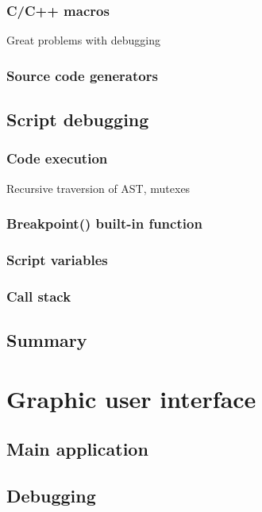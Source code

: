 \documentclass[11pt,twoside,a4paper]{book}
\begin{document}
\subsubsection{C/C++ macros}
Great problems with debugging

\subsubsection{Source code generators}


\subsection{Script debugging}

\subsubsection{Code execution}
Recursive traversion of AST, mutexes


\subsubsection{Breakpoint() built-in function}

\subsubsection{Script variables}

\subsubsection{Call stack}


\subsection{Summary}



\section{Graphic user interface}

\subsection{Main application}

\subsection{Debugging}
\end{document}
